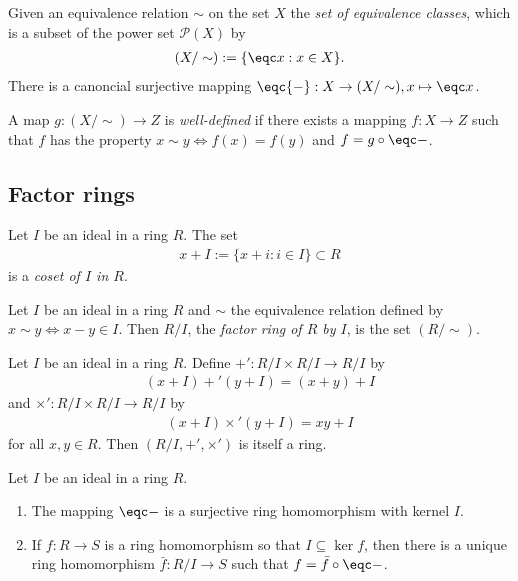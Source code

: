 \documentclass{article}
\begin{document}
\begin{definition}
    Given an equivalence relation $\sim$ on the set $X$ the \emph{set of equivalence classes},
    which is a subset of the power set $\mathcal{P}(X)$ by 
    \begin{align*}
        (X/\sim) := \{\eqc x : x \in X\}.
    \end{align*}
    There is a canoncial surjective mapping $\eqc{-}:X\to (X/\sim),x\mapsto\eqc x$. 
\end{definition}

\begin{definition}
    A map $g:(X/\sim)\to Z$ is \emph{well-defined} if there exists a mapping $f:X\to Z$
    such that $f$ has the property $x\sim y\Leftrightarrow f(x)=f(y)$ and $f=g\circ\eqc-$.
\end{definition}

\subsection{Factor rings}

\begin{definition}
    Let $I$ be an ideal in a ring $R$. The set 
    \begin{align*}
        x + I := \{x + i : i\in I\}\subset R
    \end{align*}
    is a \emph{coset of $I$ in $R$}.
\end{definition}

\begin{definition}
    Let $I$ be an ideal in a ring $R$ and $\sim$ the equivalence relation defined by 
    $x\sim y\Leftrightarrow x-y\in I$. Then $R/I$, the \emph{factor ring of $R$ by $I$},
    is the set $(R/\sim)$.
\end{definition}

\begin{theorem}[Notes 3.6.4]
    Let $I$ be an ideal in a ring $R$. Define $+':R/I\times R/I\to R/I$ by 
    \begin{align*}
        (x+I)+'(y+I) = (x+y) + I
    \end{align*}
    and $\times' : R/I\times R/I\to R/I$ by 
    \begin{align*}
        (x+I)\times' (y+I) = xy + I
    \end{align*}
    for all $x,y\in R$. Then $(R/I,+',\times')$ is itself a ring.
\end{theorem}

\begin{theorem}[Notes 3.6.7]
    Let $I$ be an ideal in a ring $R$.
    \begin{enumerate}
        \item The mapping $\eqc -$ is a surjective ring homomorphism with kernel $I$.
        \item If $f:R\to S$ is a ring homomorphism so that $I\subseteq\ker f$, then there 
            is a unique ring homomorphism $\bar f:R/I\to S$ such that $f=\bar f\circ\eqc -$.
    \end{enumerate} 
\end{theorem}
\end{document}
